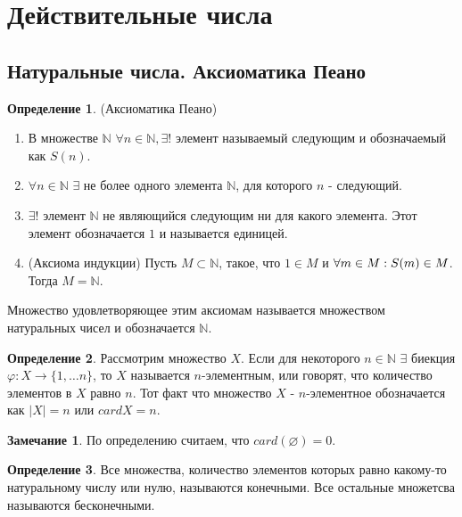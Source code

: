 \documentclass[a4paper, 12pt]{article}
\newcommand{\N}{\mathbb{N}}
\renewcommand{\phi}{\varphi}
\renewcommand{\emptyset}{\varnothing}
\theoremstyle{definition}
\newtheorem*{definition}{Определение}
\newtheorem*{comm}{Замечание}
\begin{document}
    \section{Действительные числа}
    \subsection{Натуральные числа. Аксиоматика Пеано}
        \begin{definition} (Аксиоматика Пеано)
            \begin{enumerate}
                \item В множестве $\N$ $\forall n\in \N, \exists !$ элемент называемый следующим и обозначаемый как $S(n)$.
                \item $\forall n\in \N$ $\exists$ не более одного элемента $\N$, для которого $n$ - следующий.
                \item $\exists !$ элемент $\N$ не являющийся следующим ни для какого элемента. Этот элемент обозначается $1$ и называется единицей.
                \item (Аксиома индукции) Пусть $M\subset \N$, такое, что $1\in M$ и $\forall m\in M:\\ S(m)\in M$. Тогда $M=\N$.
            \end{enumerate}
        Множество удовлетворяющее этим аксиомам называется множеством натуральных чисел и обозначается $\N$.
        \end{definition}
        \begin{definition}
            Рассмотрим  множество $X$. Если для некоторого $n\in \N$ $\exists$ биекция $\phi: X\to \{1, \dots n\}$, то $X$ называется $n$-элементным, или говорят, что количество элементов в $X$ равно $n$. Тот факт что множество $X$ - $n$-элементное обозначается как $|X|=n$ или $cardX=n$.
        \end{definition} 
        \begin{comm}
            По определению считаем, что $card(\emptyset) =0$.
        \end{comm}
        \begin{definition}
            Все множества, количество элементов которых равно какому-то натуральному числу или нулю, называются конечными. Все остальные множетсва называются бесконечными.
        \end{definition}
\end{document}
